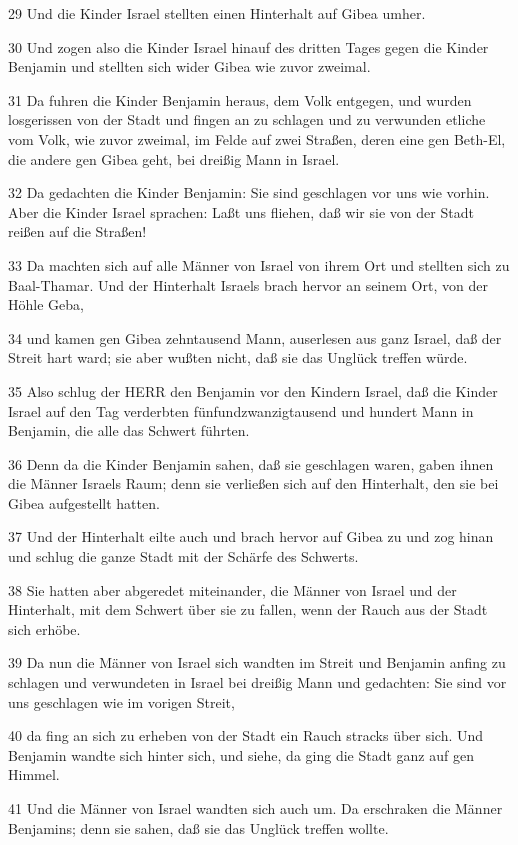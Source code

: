 \par 29 Und die Kinder Israel stellten einen Hinterhalt auf Gibea umher.
\par 30 Und zogen also die Kinder Israel hinauf des dritten Tages gegen die Kinder Benjamin und stellten sich wider Gibea wie zuvor zweimal.
\par 31 Da fuhren die Kinder Benjamin heraus, dem Volk entgegen, und wurden losgerissen von der Stadt und fingen an zu schlagen und zu verwunden etliche vom Volk, wie zuvor zweimal, im Felde auf zwei Straßen, deren eine gen Beth-El, die andere gen Gibea geht, bei dreißig Mann in Israel.
\par 32 Da gedachten die Kinder Benjamin: Sie sind geschlagen vor uns wie vorhin. Aber die Kinder Israel sprachen: Laßt uns fliehen, daß wir sie von der Stadt reißen auf die Straßen!
\par 33 Da machten sich auf alle Männer von Israel von ihrem Ort und stellten sich zu Baal-Thamar. Und der Hinterhalt Israels brach hervor an seinem Ort, von der Höhle Geba,
\par 34 und kamen gen Gibea zehntausend Mann, auserlesen aus ganz Israel, daß der Streit hart ward; sie aber wußten nicht, daß sie das Unglück treffen würde.
\par 35 Also schlug der HERR den Benjamin vor den Kindern Israel, daß die Kinder Israel auf den Tag verderbten fünfundzwanzigtausend und hundert Mann in Benjamin, die alle das Schwert führten.
\par 36 Denn da die Kinder Benjamin sahen, daß sie geschlagen waren, gaben ihnen die Männer Israels Raum; denn sie verließen sich auf den Hinterhalt, den sie bei Gibea aufgestellt hatten.
\par 37 Und der Hinterhalt eilte auch und brach hervor auf Gibea zu und zog hinan und schlug die ganze Stadt mit der Schärfe des Schwerts.
\par 38 Sie hatten aber abgeredet miteinander, die Männer von Israel und der Hinterhalt, mit dem Schwert über sie zu fallen, wenn der Rauch aus der Stadt sich erhöbe.
\par 39 Da nun die Männer von Israel sich wandten im Streit und Benjamin anfing zu schlagen und verwundeten in Israel bei dreißig Mann und gedachten: Sie sind vor uns geschlagen wie im vorigen Streit,
\par 40 da fing an sich zu erheben von der Stadt ein Rauch stracks über sich. Und Benjamin wandte sich hinter sich, und siehe, da ging die Stadt ganz auf gen Himmel.
\par 41 Und die Männer von Israel wandten sich auch um. Da erschraken die Männer Benjamins; denn sie sahen, daß sie das Unglück treffen wollte.
